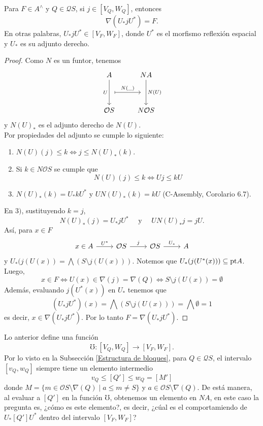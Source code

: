 \begin{prop}
    Para $F\in A^\wedge$ y $Q\in \mathcal{Q}S$, si $j\in [V_Q, W_Q]$, entonces 
    \[
    \nabla(U_* j U^*)=F.
    \]
    En otras palabras, $U_*jU^*\in [V_F,W_F]$, donde $U^*$ es el morfismo reflexión espacial y $U_*$ es su adjunto derecho.
\end{prop}

\begin{proof}
    Como $N$ es un funtor, tenemos
   \[\begin{tikzcd}
	A & NA \\
	\\
	{\mathcal{O}S} & {N\mathcal{O}S}
	\arrow[""{name=0, anchor=center, inner sep=0}, "U"', from=1-1, to=3-1]
	\arrow[""{name=1, anchor=center, inner sep=0}, "{N(U)}", from=1-2, to=3-2]
	\arrow["{N(\_)}", shorten <=7pt, shorten >=7pt, maps to, from=0, to=1]
\end{tikzcd}\]
y $N(U)_*$ es el adjunto derecho de $N(U)$.\\

Por propiedades del adjunto se cumple lo siguiente:
\begin{enumerate}
    \item $N(U)(j)\leq k\Leftrightarrow j\leq N(U)_*(k)$.
    \item Si $k\in N\mathcal{O}S$ se cumple que 
    \[
    N(U)(j)\leq k\Leftrightarrow Uj\leq kU
    \]
    \item $N(U)_*(k)=U_*kU^*$ y $UN(U)_*(k)=kU$ (C-Assembly, Corolario 6.7).
\end{enumerate}
En $3)$, sustituyendo $k=j$,  
\[
N(U)_*(j)=U_*jU^* \quad\mbox{ y }\quad UN(U)_*j=jU.
\] 
Así, para $x\in F$
\[\begin{tikzcd}
	x\in A & {\mathcal{O}S} & {\mathcal{O}S} & A
	\arrow["{U^*}", from=1-1, to=1-2]
	\arrow["j", from=1-2, to=1-3]
	\arrow["{U_*}", from=1-3, to=1-4]
\end{tikzcd}\]
y $U_*(j(U(x))=\bigwedge(S\setminus j(U(x)))$. Notemos que $U_*(j(U^*(x)))\subseteq \mathrm{pt} A$. Luego,
\[
x\in F \Leftrightarrow U(x)\in \nabla(j)=\nabla(Q)\Leftrightarrow S\setminus j(U(x))=\emptyset
\]
Además, evaluando $j(U^*(x))$ en $U_*$ tenemos que 
\[
(U_*jU^*)(x)=\bigwedge (S\setminus j(U(x)))=\bigwedge\emptyset=1
\]
es decir, $x\in \nabla(U_*jU^*)$. Por lo tanto $F=\nabla(U_*jU^*)$.
\end{proof}

Lo anterior define una función 
\[
\mho\colon [V_Q, W_Q]\to [V_F, W_F].
\]
Por lo visto en la Subsección \ref{Estructura de bloques}, para $Q\in \mathcal{Q}S$, el intervalo $[v_Q, w_Q]$ siempre tiene un elemento intermedio
\[
v_Q\leq [Q']\leq w_Q=[M']
\]
donde $M=\{m\in \mathcal{O}S\setminus \nabla(Q)\mid a\leq m\neq S\}$ y $a\in \mathcal{O}S\setminus \nabla(Q)$. De está manera, al evaluar a $[Q']$ en la función $\mho$, obtenemos
un elemento en $NA$, en este caso la pregunta es, ¿cómo es este elemento?, es decir, ¿cúal es el comportamiendo de $U_*[Q']U^*$ dentro del intervalo $[V_F, W_F]$?\\

